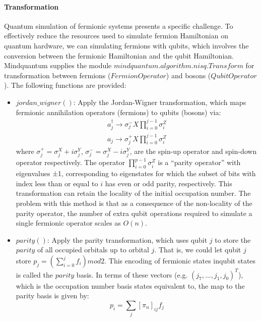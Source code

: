 \paragraph{Transformation}
Quantum simulation of fermionic systems presents a specific challenge. To effectively reduce the resources used to simulate fermion Hamiltonian on quantum hardware, we can simulating fermions with qubits, which involves the conversion between the fermionic Hamiltonian and the qubit Hamiltonian. Mindquantum supplies the module $mindquantum.algorithm.nisq.Transform$ for transformation between fermions ($FermionOperator$) and bosons ($QubitOperator$). The following functions are provided: 
\begin{itemize}
    \item $jordan\_wigner()$: Apply the Jordan-Wigner transformation, which maps fermionic annihilation operators (fermions) to qubits (bosons) via: 
    \begin{equation}
        \begin{split}
        a_j^{\dagger} \to {\sigma}_j^{-} X \prod_{i=0}^{j-1} {\sigma}^Z_i \\
        a_j \to {\sigma}_j^{+} X \prod_{i=0}^{j-1} {\sigma}^Z_i
        \end{split}
    \end{equation}
    where ${\sigma}_j^{+} = {\sigma}_j^X+i{\sigma}_j^Y$, ${\sigma}_j^{-} = {\sigma}_j^X-i{\sigma}_j^Y$, are the spin-up operator and spin-down operator respectively. The operator $\prod_{i=0}^{p-1} {{\sigma}^Z_i}$ is a “parity operator” with eigenvalues ±1, corresponding to eigenstates for which the subset of bits with index less than or equal to $i$ has even or odd parity, respectively. This transformation can retain the locality of the initial occupation number. The problem with this method is that as a consequence of the non-locality of the parity operator, the number of extra qubit operations required to simulate a single fermionic operator scales as $O(n)$. 
    \item $parity()$: Apply the parity transformation, which uses qubit $j$ to store the $parity$ of all occupied orbitals up to orbital $j$. That is, we could let qubit $j$ store $p_j = (\sum_{i=0}^j f_i) mod 2$. This encoding of fermionic states inqubit states is called the $parity$ basis. In terms of these vectors (e.g. $(j_7,...,j_1,j_0)^T$), which is the occupation number basis states equivalent to, the map to the parity basis is given by: 
    \begin{equation}
        p_i = \sum_j {[\pi_n]_{ij} f_j}

\end{equation}
\end{itemize}
